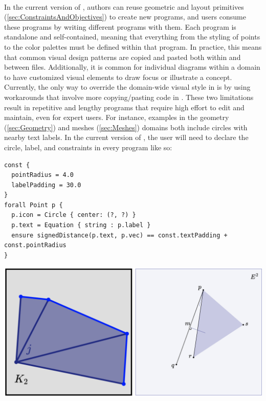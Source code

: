 \paragraph{\inlineSTY{\Style{}}}  In the current version of \Penrose{}, authors can reuse geometric and layout primitives (\cref{sec:ConstraintsAndObjectives}) to create new \Style{} programs, and users consume these programs by writing different \Substance{} programs with them. Each \Style{} program is standalone and self-contained, meaning that everything from the styling of points to the color palettes must be defined within that program. In practice, this means that common visual design patterns are copied and pasted both within and between \Style{} files. Additionally, it is common for individual diagrams within a domain to have customized visual elements to draw focus or illustrate a concept. Currently, the only way to override the domain-wide visual style in \Penrose{} is by using workarounds that involve more copying/pasting code in \Style{}. These two limitations result in repetitive and lengthy programs that require high effort to edit and maintain, even for expert \Penrose{} users. For instance, examples in the geometry (\cref{sec:Geometry}) and meshes (\cref{sec:Meshes}) domains both include circles with nearby text labels. In the current version of \Penrose{}, the user will need to declare the circle, label, and constraints in every \Style{} program like so:
\vspace{1em}
\begin{mdframed}[style=STYCode]
\begin{lstlisting}[language=Sty-geom,escapechar=@]
const {
  pointRadius = 4.0
  labelPadding = 30.0
}
forall Point p {
  p.icon = Circle { center: (?, ?) }
  p.text = Equation { string : p.label }
  ensure signedDistance(p.text, p.vec) == const.textPadding + const.pointRadius 
}
\end{lstlisting}
\end{mdframed}
\begin{center}
\includegraphics[width=.7\linewidth]{assets/penrose/shared-point.png}
\end{center}
\vspace{1em}

